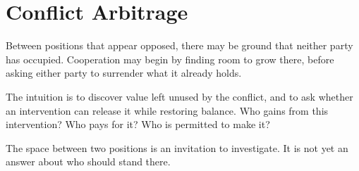 \chapter{Conflict Arbitrage}
\label{short:conflict-arbitrage}

Between positions that appear opposed, there may be ground that neither party
has occupied. Cooperation may begin by finding room to grow there, before
asking either party to surrender what it already holds.

The intuition is to discover value left unused by the conflict, and to ask
whether an intervention can release it while restoring balance. Who gains
from this intervention? Who pays for it? Who is permitted to make it?

The space between two positions is an invitation to investigate. It is not
yet an answer about who should stand there.

